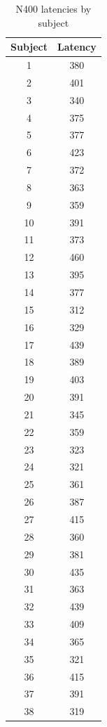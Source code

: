 \documentclass{article}
\begin{document}
\begin{table}
\caption{\label{tab:latencies}N400 latencies by subject}
\begin{tabular}{c|c}
Subject & Latency\\
\hline1&380\\
2&401\\
3&340\\
4&375\\
5&377\\
6&423\\
7&372\\
8&363\\
9&359\\
10&391\\
11&373\\
12&460\\
13&395\\
14&377\\
15&312\\
16&329\\
17&439\\
18&389\\
19&403\\
20&391\\
21&345\\
22&359\\
23&323\\
24&321\\
25&361\\
26&387\\
27&415\\
28&360\\
29&381\\
30&435\\
31&363\\
32&439\\
33&409\\
34&365\\
35&321\\
36&415\\
37&391\\
38&319
\end{tabular}
\end{table}
\end{document}
